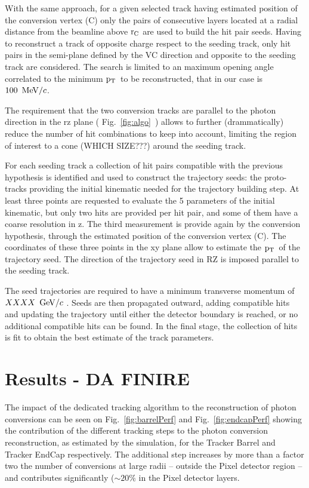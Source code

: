 \documentclass[a4paper]{jpconf}
\def \pt{$\p_{\rm T}$~}
\begin{document}
With the same approach, for a given selected track  having  estimated position of the conversion vertex (C) only the pairs of consecutive layers located at a radial distance from the beamline above $\rm r_C$ are used to build the hit pair seeds. 
Having to reconstruct a track of opposite charge respect to the seeding track, only hit pairs in the semi-plane defined by the VC direction and opposite to the seeding track are considered. The search is limited to an maximum opening angle correlated to the minimum \pt to be reconstructed, that in our case is $100~{\rm \, MeV}/c$.

The requirement that the two conversion tracks are parallel to the photon direction in the rz plane ( Fig.~\ref{fig:algo}~) allows to further (drammatically) reduce the number of hit combinations to keep into account, limiting the region of interest to a cone (WHICH SIZE???) around the seeding track.


For each seeding track a collection of hit pairs compatible with the previous hypothesis is identified and used to construct the trajectory seeds: the proto-tracks providing the initial kinematic needed for the trajectory building step.
At least three points are requested to evaluate the 5 parameters of the initial kinematic, but only two hits are provided per hit pair, and some of them have a coarse resolution in z. The third measurement is provide again by the conversion hypothesis, through the estimated position of the conversion vertex (C). The coordinates of these three points in the xy plane allow to estimate the \pt of the trajectory seed. The direction of the trajectory seed in RZ is imposed parallel to the seeding track.


The seed trajectories are required
to have a minimum transverse momentum of $XXXX~{\rm \, GeV}/c$ .
Seeds are then
propagated outward, adding compatible hits and updating the trajectory
until either the detector boundary is reached, or no additional
compatible hits can be found.  In the final stage, the collection of
hits is fit to obtain the best estimate of the track parameters.

\section{Results - DA FINIRE}

The impact of the dedicated tracking algorithm  to the reconstruction of photon conversions
 can be seen on Fig.~\ref{fig:barrelPerf} and Fig.~\ref{fig:endcapPerf} 
showing the contribution of the different tracking steps to the photon conversion
reconstruction, as estimated by the simulation, for the Tracker Barrel and Tracker EndCap respectively.
The additional step increases by more than a factor two the number of conversions at large radii --
outside the Pixel detector region -- and contributes significantly ($\sim 20\%$ in the Pixel detector layers.
 
\end{document}
